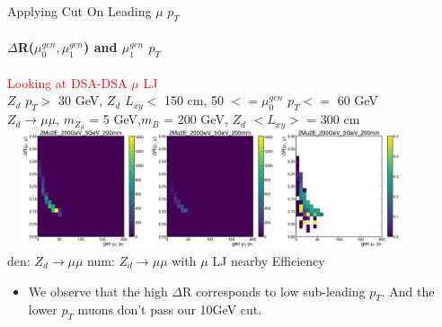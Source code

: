 \documentclass{beamer}
\begin{document}
\begin{frame}[t]{Applying Cut On Leading $\mu$ $p_T$}
\framesubtitle{$\Delta$R($\mu^{gen}_0, \mu^{gen}_1$) and $\mu_1^{gen}$ $p_T$}

\centering
\textcolor{red}{Looking at DSA-DSA $\mu$ LJ}\\
 $Z_d$ $p_T>$ 30 GeV, $Z_d$ $L_{xy}<$ 150 cm, 50  $<= \mu_0^{gen}$ $p_T<=$ 60 GeV\\
\scriptsize
\textcolor{UniBlue}{$Z_d \rightarrow \mu\mu$}, \textcolor{uvaorange}{$m_{Z_d}$ = 5 GeV,$m_B$ = 200 GeV, $Z_d$ $<L_{xy}>$ = 300 cm}\\
\includegraphics[width =12cm, height =3.5cm]{zd_mumu_genMu1_pt_dR_5_leadingpT_50to60.png}\\
{\tiny \textcolor{uvaorange}{\hspace{-1cm}den: $Z_d\rightarrow\mu\mu$ \hspace{2.5cm } num: $Z_d\rightarrow\mu\mu$ with  $\mu$ LJ nearby\hspace{2cm} Efficiency\\}}
\normalsize
\begin{itemize}
    \item  We observe that the high $\Delta$R corresponds to low sub-leading $p_T$. And the lower $p_T$ muons don't pass our 10GeV cut.
\end{itemize}

    
\end{frame}
\end{document}
